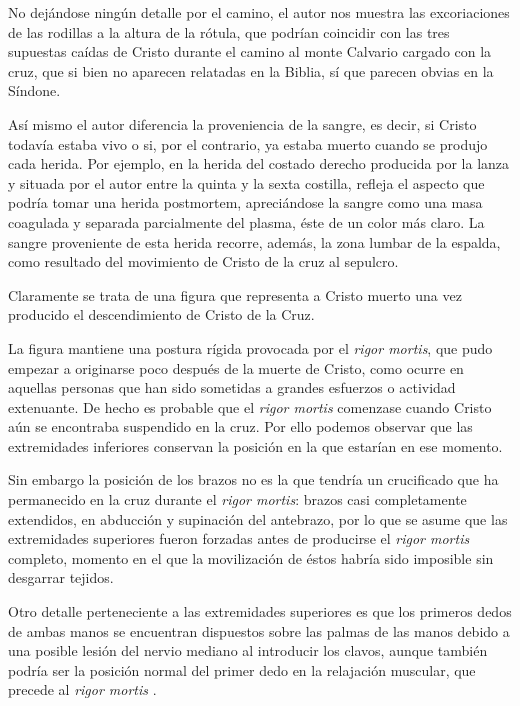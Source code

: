 No dejándose ningún detalle por el camino, el autor nos muestra las excoriaciones de las rodillas a la altura de la rótula, que podrían coincidir con las tres supuestas caídas de Cristo durante el camino al monte Calvario cargado con la cruz, que si bien no aparecen relatadas en la Biblia, sí que parecen obvias en la Síndone.

Así mismo el autor diferencia la proveniencia de la sangre, es decir, si Cristo todavía estaba vivo o si, por el contrario, ya estaba muerto cuando se produjo cada herida. Por ejemplo, en la herida del costado derecho producida por la lanza y situada por el autor entre la quinta y la sexta costilla, refleja el aspecto que podría tomar una herida postmortem, apreciándose la sangre como una masa coagulada y separada parcialmente del plasma, éste de un color más claro. La sangre proveniente de esta herida recorre, además, la zona lumbar de la espalda, como resultado del movimiento de Cristo de la cruz al sepulcro.

Claramente se trata de una figura que representa a Cristo muerto una vez producido el descendimiento de Cristo de la Cruz.

La figura mantiene una postura rígida provocada por el \textit{rigor mortis}, que pudo empezar a originarse poco después de la muerte de Cristo, como ocurre en aquellas personas que han sido sometidas a grandes esfuerzos o actividad extenuante\cite{RefWorks:60}. De hecho es probable que el \textit{rigor mortis} comenzase cuando Cristo aún se encontraba suspendido en la cruz. Por ello podemos observar que las extremidades inferiores conservan la posición en la que estarían en ese momento.

Sin embargo la posición de los brazos no es la que tendría un crucificado que ha permanecido en la cruz durante el \textit{rigor mortis}: brazos casi completamente extendidos, en abducción y supinación del antebrazo, por lo que se asume que las extremidades superiores fueron forzadas antes de producirse el \textit{rigor mortis} completo, momento en el que la movilización de éstos habría sido imposible sin desgarrar tejidos. 

Otro detalle perteneciente a las extremidades superiores es que los primeros dedos de ambas manos se encuentran dispuestos sobre las palmas de las manos debido a una posible lesión del nervio mediano al introducir los clavos, aunque también podría ser la posición normal del primer dedo en la relajación muscular, que precede al \textit{rigor mortis}%
.

